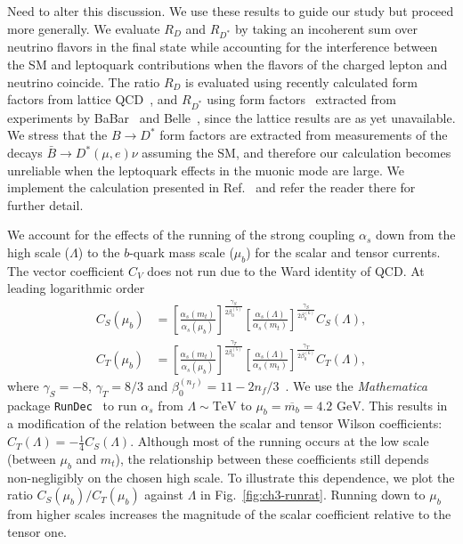 {\color{red}Need to alter this discussion.} We use these results to guide our
study but proceed more generally. We evaluate $R_D$ and $R_{D^{*}}$ by taking an
incoherent sum over neutrino flavors in the final state while accounting for the
interference between the SM and leptoquark contributions when the flavors of the
charged lepton and neutrino coincide. The ratio $R_D$ is evaluated using
recently calculated form factors from lattice QCD~\cite{Lattice:2015rga}, and
$R_{D^{*}}$ using form factors~\cite{Amhis:2012bh} extracted from experiments by
BaBar~\cite{Aubert:2007rs, Aubert:2008yv} and Belle~\cite{Abe:2001yf,
  Dungel:2010uk}, since the lattice results are as yet unavailable. We stress
that the $B \rightarrow D^{*}$ form factors are extracted from measurements of
the decays $\bar{B} \rightarrow D^* (\mu, e) \nu$ assuming the SM, and therefore
our calculation becomes unreliable when the leptoquark effects in the muonic
mode are large. We implement the calculation presented in
Ref.~\cite{Bardhan:2016uhr} and refer the reader there for further detail.

We account for the effects of the running of the strong coupling $\alpha_s$ down
from the high scale ($\Lambda$) to the $b$-quark mass scale ($\mu_b$) for the
scalar and tensor currents. The vector coefficient $C_V$ does not run due to the
Ward identity of QCD. At leading logarithmic order
\begin{subequations} \label{eq:ch3-runningrd}
  \begin{align}
    C_S (\mu_b) &= \left[ \frac{\alpha_s(m_t)}{\alpha_s(\mu_b)} \right]^{\frac{\gamma_S}{2\beta_0^{(5)}}} \left[ \frac{\alpha_s(\Lambda)}{\alpha_s(m_t)} \right]^{\frac{\gamma_S}{2\beta_0^{(6)}}} C_S(\Lambda),\\
    C_T (\mu_b) &= \left[ \frac{\alpha_s(m_t)}{\alpha_s(\mu_b)} \right]^{\frac{\gamma_T}{2\beta_0^{(5)}}} \left[ \frac{\alpha_s(\Lambda)}{\alpha_s(m_t)} \right]^{\frac{\gamma_T}{2\beta_0^{(6)}}}C_T(\Lambda),
  \end{align}
\end{subequations}
where $\gamma_S = -8$, $\gamma_T = 8/3$ and $\beta_0^{(n_f)} = 11 -
2n_f/3$~\cite{Dorsner:2013tla}. We use the \textit{Mathematica} package
\texttt{RunDec}~\cite{Chetyrkin:2000yt} to run $\alpha_s$ from $\Lambda \sim
\text{TeV}$ to $\mu_b = \overline{m_b} = 4.2 \text{ GeV}$. This results in a
modification of the relation between the scalar and tensor Wilson coefficients:
$C_T(\Lambda) = -\frac{1}{4} C_S(\Lambda)$. Although most of the running occurs
at the low scale (between $\mu_b$ and $m_t$), the relationship between these
coefficients still depends non-negligibly on the chosen high scale. To
illustrate this dependence, we plot the ratio $C_S(\mu_b)/C_T(\mu_b)$ against
$\Lambda$ in Fig.~\ref{fig:ch3-runrat}. Running down to $\mu_b$ from higher scales
increases the magnitude of the scalar coefficient relative to the tensor one.

